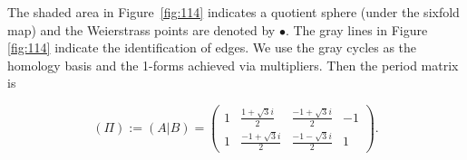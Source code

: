 \documentclass[12pt,reqno]{amsart}
\newenvironment{dami}{
  \medskip
\begin{color}{blue}
    \textcolor{purple}{\textbf{Dami:}} 
}{
\end{color}
  \medskip
}
\DeclareMathOperator{\Aut}{Aut}
\theoremstyle{definition}
\theoremstyle{remark}
\begin{document}
The shaded area in Figure~\ref{fig:114} indicates a quotient sphere (under the sixfold map) and the Weierstrass points are denoted by $\bullet.$ The gray lines in Figure~ \cref{fig:114} indicate the identification of edges. We use the gray cycles as the homology basis and the 1-forms achieved via multipliers. Then the period matrix is

$$(\Pi) := (A | B) = \begin{pmatrix}1 & \frac{1 + \sqrt{3} i}{2} &  \frac{-1 + \sqrt{3} i}{2} & -1\\
1 & \frac{-1 + \sqrt{3} i}{2} & \frac{-1 - \sqrt{3} i}{2} & 1 \end{pmatrix}.$$











\end{document}
